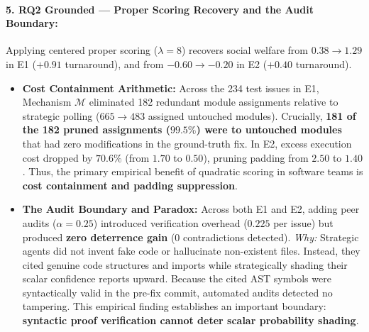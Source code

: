 \documentclass{article}
\theoremstyle{definition}
\begin{document}
\paragraph{5. RQ2 Grounded — Proper Scoring Recovery and the Audit Boundary:}
Applying centered proper scoring ($\lambda = 8$) recovers social welfare from $0.38 \to 1.29$ in E1 ($+0.91$ turnaround), and from $-0.60 \to -0.20$ in E2 ($+0.40$ turnaround).
\begin{itemize}
    \item \textbf{Cost Containment Arithmetic:} Across the 234 test issues in E1, Mechanism $\mathcal{M}$ eliminated 182 redundant module assignments relative to strategic polling ($665 \to 483$ assigned untouched modules). Crucially, \textbf{181 of the 182 pruned assignments ($99.5\%$) were to untouched modules} that had zero modifications in the ground-truth fix. In E2, excess execution cost dropped by $70.6\%$ (from $1.70$ to $0.50$), pruning padding from $2.50$ to $1.40$. Thus, the primary empirical benefit of quadratic scoring in software teams is \textbf{cost containment and padding suppression}.
    \item \textbf{The Audit Boundary and Paradox:} Across both E1 and E2, adding peer audits ($\alpha = 0.25$) introduced verification overhead ($0.225$ per issue) but produced \textbf{zero deterrence gain} (0 contradictions detected).
    \emph{Why:} Strategic agents did not invent fake code or hallucinate non-existent files. Instead, they cited genuine code structures and imports while strategically shading their scalar confidence reports upward. Because the cited AST symbols were syntactically valid in the pre-fix commit, automated audits detected no tampering. This empirical finding establishes an important boundary: \textbf{syntactic proof verification cannot deter scalar probability shading}.
\end{itemize}
\end{document}
